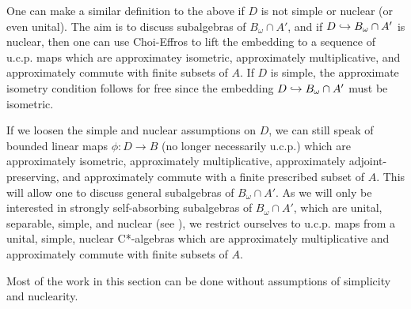 \documentclass[12pt]{amsart}
\begin{document}
  \begin{remark}
    One can make a similar definition to the above if $D$ is not simple or nuclear (or even unital). The aim is to discuss subalgebras of $B_\omega \cap A'$, and if $D \hookrightarrow B_\omega \cap A'$ is nuclear, then one can use Choi-Effros to lift the embedding to a sequence of u.c.p. maps which are approximatey isometric, approximately multiplicative, and approximately commute with finite subsets of $A$. If $D$ is simple, the approximate isometry condition follows for free since the embedding $D \hookrightarrow B_\omega \cap A'$ must be isometric.
    
If we loosen the simple and nuclear assumptions on $D$, we can still speak of bounded linear maps $\phi:D \to B$ (no longer necessarily u.c.p.) which are approximately isometric, approximately multiplicative, approximately adjoint-preserving, and approximately commute with a finite prescribed subset of $A$. This will allow one to discuss general subalgebras of $B_\omega \cap A'$. As we will only be interested in strongly self-absorbing subalgebras of $B_\omega \cap A'$, which are unital, separable, simple, and nuclear (see \cite[Section 1.6]{TomsWinter07}), we restrict ourselves to u.c.p. maps from a unital, simple, nuclear C*-algebras which are approximately multiplicative and approximately commute with finite subsets of $A$.

Most of the work in this section can be done without assumptions of simplicity and nuclearity. 
  \end{remark}
\end{document}
